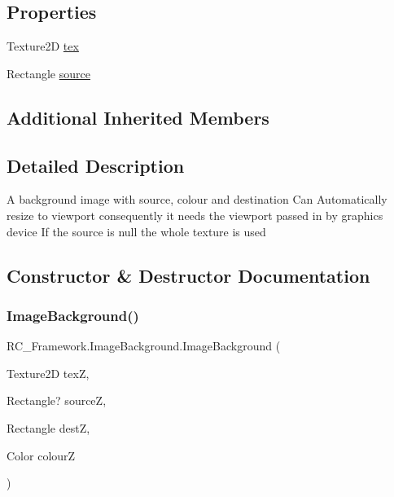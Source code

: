 \subsection*{Properties}
\begin{DoxyCompactItemize}
\item 
Texture2D \mbox{\hyperlink{class_r_c___framework_1_1_image_background_acbae55d0eec7e9db3b3dd1e6adcbd01e}{tex}}
\item 
Rectangle \mbox{\hyperlink{class_r_c___framework_1_1_image_background_a58fe22eaa5ab35456cd3a1d8c4b06295}{source}}
\end{DoxyCompactItemize}
\subsection*{Additional Inherited Members}


\subsection{Detailed Description}
A background image with source, colour and destination Can Automatically resize to viewport consequently it needs the viewport passed in by graphics device If the source is null the whole texture is used 



\subsection{Constructor \& Destructor Documentation}
\mbox{\label{class_r_c___framework_1_1_image_background_ad66973504fc9518e98e0757458973880}} 
\subsubsection{\texorpdfstring{Image\+Background()}{ImageBackground()}\hspace{0.1cm}{\footnotesize\ttfamily [1/2]}}
{\footnotesize\ttfamily R\+C\+\_\+\+Framework.\+Image\+Background.\+Image\+Background (\begin{DoxyParamCaption}\item[{Texture2D}]{texZ,  }\item[{Rectangle?}]{sourceZ,  }\item[{Rectangle}]{destZ,  }\item[{Color}]{colourZ }\end{DoxyParamCaption})}

